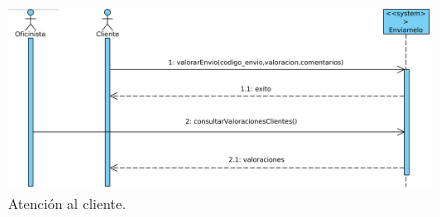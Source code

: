 \documentclass[12pt,spanish]{article}
\begin{document}
\begin{figure}[H]
\centering
\includegraphics[scale=0.8]{atencion_cliente.png}
\caption{Atención al cliente.}
\end{figure}


\end{document}
